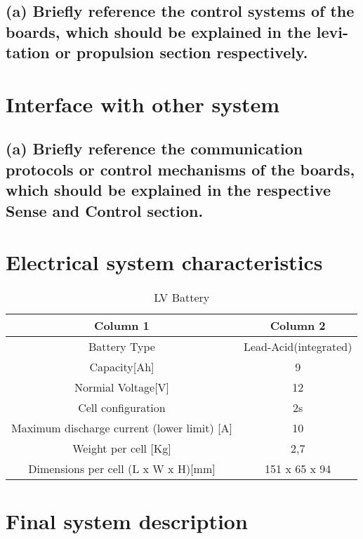 \subsection{(a) Briefly reference the control systems of the boards, which should be explained in the levi- tation or propulsion section respectively.}


\section{Interface with other system}
\subsection{(a) Briefly reference the communication protocols or control mechanisms of the boards, which should be explained in the respective Sense and Control section.}

\section{Electrical system characteristics}
\begin{table}
    \centering
    \begin{tabular}{|c|c|}
       \hline
       \textbf{Column 1} & \textbf{Column 2}  \\
       \hline
       Battery Type & Lead-Acid(integrated)\\
       \hline
       Capacity[Ah] & 9 \\
       \hline
       Normial Voltage[V] & 12 \\
       \hline
       Cell configuration & 2s \\
       \hline
       Maximum discharge current (lower limit) [A] & 10 \\
       \hline
       Weight per cell [Kg] & 2,7 \\
       \hline 
       Dimensions per cell (L x W x H)[mm] & 151 x 65 x 94 \\
       \hline 
    \end{tabular}
    \caption{LV Battery}
    \label{Electrical system characteristics} 
\end{table}    


\section{Final system description}

